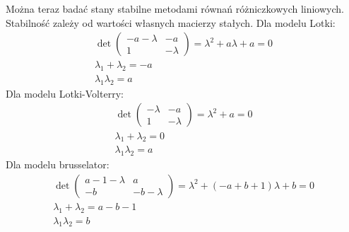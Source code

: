 \documentclass[10pt, a4paper, twoside, onecolumn]{article}
\numberwithin{equation}{section}
\begin{document}
	Można teraz badać stany stabilne metodami równań różniczkowych liniowych. Stabilność zależy od wartości własnych macierzy stałych. Dla modelu Lotki:
	\begin{gather}
		\det
		\begin{pmatrix}
			-a-\lambda & -a \\
			1 & -\lambda
		\end{pmatrix}
		=\lambda^{2}+a\lambda+a=0 \\
		\lambda_{1}+\lambda_{2}=-a \\
		\lambda_{1}\lambda_{2}=a
	\end{gather}
	Dla modelu Lotki-Volterry:
	\begin{gather}
		\det
		\begin{pmatrix}
			-\lambda & -a \\
			1 & -\lambda
		\end{pmatrix}
		=\lambda^{2}+a=0 \\
		\lambda_{1}+\lambda_{2}=0 \\
		\lambda_{1}\lambda_{2}=a
	\end{gather}
	Dla modelu brusselator:
	\begin{gather}
		\det
		\begin{pmatrix}
			a-1-\lambda & a \\
			-b & -b-\lambda
		\end{pmatrix}
		=\lambda^{2}+(-a+b+1)\lambda+b=0 \\
		\lambda_{1}+\lambda_{2}=a-b-1 \\
		\lambda_{1}\lambda_{2}=b
	\end{gather}
\end{document}
